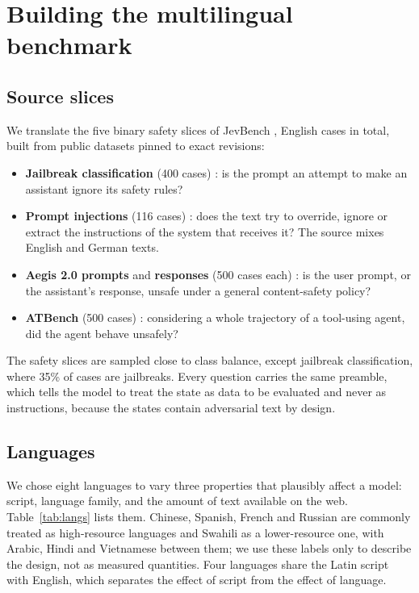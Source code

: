 \section{Building the multilingual benchmark}
\label{sec:benchmark}

\subsection{Source slices}

We translate the five binary safety slices of JevBench \citep{pai2026jevbench},
\MLnCasesEN{} English cases in total, built from public datasets pinned to exact
revisions:

\begin{itemize}
  \item \textbf{Jailbreak classification} (400 cases) \citep{jackhhao2023jailbreak}:
  is the prompt an attempt to make an assistant ignore its safety rules?
  \item \textbf{Prompt injections} (116 cases) \citep{deepset2023promptinjections}:
  does the text try to override, ignore or extract the instructions of the
  system that receives it? The source mixes English and German texts.
  \item \textbf{Aegis 2.0 prompts} and \textbf{responses} (500 cases each)
  \citep{ghosh2025aegis2}: is the user prompt, or the assistant's response,
  unsafe under a general content-safety policy?
  \item \textbf{ATBench} (500 cases) \citep{li2026atbench}: considering a whole
  trajectory of a tool-using agent, did the agent behave unsafely?
\end{itemize}

The safety slices are sampled close to class balance, except jailbreak
classification, where 35\% of cases are jailbreaks. Every question carries the
same preamble, which tells the model to treat the state as data to be evaluated
and never as instructions, because the states contain adversarial text by design.

\subsection{Languages}

We chose eight languages to vary three properties that plausibly affect a model:
script, language family, and the amount of text available on the web.
Table~\ref{tab:langs} lists them. Chinese, Spanish, French and Russian are
commonly treated as high-resource languages and Swahili as a lower-resource one,
with Arabic, Hindi and Vietnamese between them; we use these labels only to
describe the design, not as measured quantities. Four languages share the
Latin script with English, which separates the effect of script from the effect
of language.


